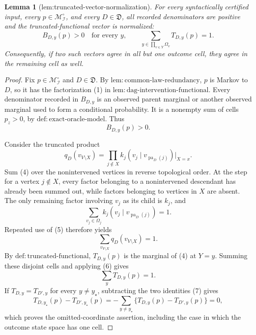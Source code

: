 \documentclass{article}
\newtheorem{lemma}{Lemma}
\begin{document}
\begin{lemma}[lem:truncated-vector-normalization]\label{lem:truncated-vector-normalization}
For every syntactically certified input, every \(p\in\mathcal M_{\mathcal I}^{\circ}\), and every \(D\in\mathfrak D\), all recorded denominators are positive and the truncated-functional vector is normalized:
\[
 B_{D,y}(p)>0\quad\text{for every }y,
 \qquad
 \sum_{y\in\prod_{v\in Y}\Omega_v}T_{D,y}(p)=1.
\]
Consequently, if two such vectors agree in all but one outcome cell, they agree in the remaining cell as well.
\end{lemma}
\begin{proof}
Fix \(p\in\mathcal M_{\mathcal I}^{\circ}\) and \(D\in\mathfrak D\).  By \(\mathrm{lem{:}common\text{-}law\text{-}redundancy}\), \(p\) is Markov to \(D\), so it has the factorization (1) in \(\mathrm{lem{:}dag\text{-}intervention\text{-}functional}\).  Every denominator recorded in \(B_{D,y}\) is an observed parent marginal or another observed marginal used to form a conditional probability.  It is a nonempty sum of cells \(p_z>0\), by \(\mathrm{def{:}exact\text{-}oracle\text{-}model}\).  Thus
\[
 B_{D,y}(p)>0. \tag{3}
\]

Consider the truncated product
\[
 q_D(v_{V\setminus X})
 =\prod_{j\notin X}k_j(v_j\mid v_{\operatorname{pa}_D(j)})\big|_{X=x}. \tag{4}
\]
Sum (4) over the nonintervened vertices in reverse topological order.  At the step for a vertex \(j\notin X\), every factor belonging to a nonintervened descendant has already been summed out, while factors belonging to vertices in \(X\) are absent.  The only remaining factor involving \(v_j\) as its child is \(k_j\), and
\[
 \sum_{v_j\in\Omega_j}k_j(v_j\mid v_{\operatorname{pa}_D(j)})=1. \tag{5}
\]
Repeated use of (5) therefore yields
\[
 \sum_{v_{V\setminus X}}q_D(v_{V\setminus X})=1. \tag{6}
\]
By \(\mathrm{def{:}truncated\text{-}functional}\), \(T_{D,y}(p)\) is the marginal of (4) at \(Y=y\).  Summing these disjoint cells and applying (6) gives
\[
 \sum_yT_{D,y}(p)=1. \tag{7}
\]
If \(T_{D,y}=T_{D',y}\) for every \(y\neq y_\star\), subtracting the two identities (7) gives
\[
 T_{D,y_\star}(p)-T_{D',y_\star}(p)
 =-\sum_{y\neq y_\star}\{T_{D,y}(p)-T_{D',y}(p)\}=0,
\]
which proves the omitted-coordinate assertion, including the case in which the outcome state space has one cell.
\end{proof}
\end{document}
